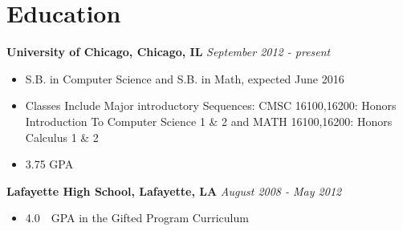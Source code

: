 \documentclass[11pt,letterpaper]{article} %
\begin{document}
    \section*{Education}
        \textbf{University of Chicago, Chicago, IL } \hfill \textit{ September 2012 - present } 
        \begin{itemize} 
            \item S.B. in Computer Science and S.B. in Math, expected June 2016 
            \item Classes Include Major introductory Sequences: CMSC 16100,16200: 
                Honors Introduction To Computer Science 1 \& 2 and 
                MATH 16100,16200: Honors Calculus 1 \& 2
            \item 3.75 GPA
        \end{itemize}
        \textbf{ Lafayette High School, Lafayette, LA } \hfill \textit{August 2008 - May 2012 }  
        \begin{itemize} 
            \item 4.0\ \  GPA in the  Gifted Program Curriculum
            \end{itemize}
    \vfill
    \centerline{ }
\end{document}
